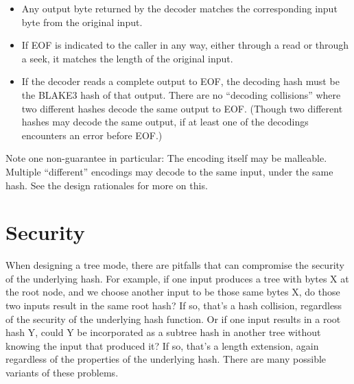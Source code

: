 \documentclass[11pt,notitlepage,a4paper]{article}
\newcommand{\name}{BLAKE3\xspace}
\begin{document}
\begin{itemize}
\item Any output byte returned by the decoder matches the corresponding input byte from the original input.
\item If EOF is indicated to the caller in any way, either through a read or through a seek, it matches the length of the original input.
\item If the decoder reads a complete output to EOF, the decoding hash must be the \name hash of that output. There are no ``decoding collisions'' where two different hashes decode the same output to EOF. (Though two different hashes may decode the same output, if at least one of the decodings encounters an error before EOF.)
\end{itemize}
Note one non-guarantee in particular: The encoding itself may be malleable. Multiple ``different'' encodings may decode to the same input, under the same hash. See the design rationales for more on this.

\section{Security}\label{sec:security}

When designing a tree mode, there are pitfalls that can compromise the security of the underlying hash. For example, if one input produces a tree with bytes X at the root node, and we choose another input to be those same bytes X, do those two inputs result in the same root hash? If so, that's a hash collision, regardless of the security of the underlying hash function. Or if one input results in a root hash Y, could Y be incorporated as a subtree hash in another tree without knowing the input that produced it? If so, that's a length extension, again regardless of the properties of the underlying hash. There are many possible variants of these problems.
\end{document}
